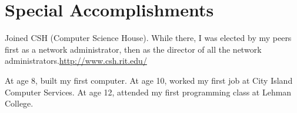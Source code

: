 \documentclass[a4paper,margin,line]{resume}
\newcommand{\rurl}[1]{\hfill {\footnotesize \url{#1}}}
\begin{document}
\begin{resume}
\begin{compactdesc}
	\end{compactdesc}



\section{\mysidestyle Special Accomplishments}
	\begin{asparablank}
		\item Joined CSH ({\small Computer Science House}). While there, I was elected by my peers first as a network administrator, then as the director of all the network administrators.\rurl{http://www.csh.rit.edu/}
		\item At age 8, built my first computer. At age 10, worked my first job at City Island Computer Services. At age 12, attended my first programming class at Lehman College.
	\end{asparablank}

\end{resume}
\end{document}
